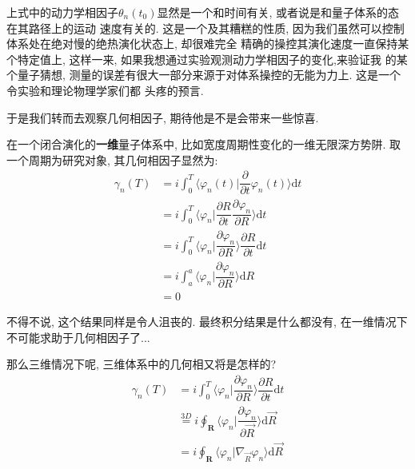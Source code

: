 \documentclass[a4paper, 11pt]{article}
\begin{document}
\begin{spacing}{1.2}
        上式中的动力学相因子$\theta_n(t_0)$显然是一个和时间有关, 或者说是和量子体系的态在其路径上的运动
        速度有关的. 这是一个及其糟糕的性质, 因为我们虽然可以控制体系处在绝对慢的绝热演化状态上, 却很难完全
        精确的操控其演化速度一直保持某个特定值上, 这样一来, 如果我想通过实验观测动力学相因子的变化,来验证我
        的某个量子猜想, 测量的误差有很大一部分来源于对体系操控的无能为力上. 这是一个令实验和理论物理学家们都
        头疼的预言. 

        于是我们转而去观察几何相因子, 期待他是不是会带来一些惊喜. 

        在一个闭合演化的\textbf{一维}量子体系中, 比如宽度周期性变化的一维无限深方势阱. 
        取一个周期为研究对象, 其几何相因子显然为:
        \begin{equation}
          \begin{aligned}
            \gamma_n(T) &=i\int_0^T\langle\varphi_n(t)|\dfrac{\partial}{\partial{}t}\varphi_n(t)\rangle\mathrm{d}t\\
                        &=i\int_0^T\langle\varphi_n|\dfrac{\partial{}R}{\partial{}t}\dfrac{\partial\varphi_n}{\partial{}R}\rangle\mathrm{d}t\\
                        &=i\int_0^T\langle\varphi_n|\dfrac{\partial\varphi_n}{\partial{}R}\rangle\dfrac{\partial{}R}{\partial{}t}\mathrm{d}t\\
                        &=i\int_a^a\langle\varphi_n|\dfrac{\partial\varphi_n}{\partial{}R}\rangle\mathrm{d}R\\
                        &=0
          \end{aligned}
        \end{equation}
        
        不得不说, 这个结果同样是令人沮丧的. 最终积分结果是什么都没有, 在一维情况下不可能求助于几何相因子了...

        那么三维情况下呢, 三维体系中的几何相又将是怎样的?
        \begin{equation}
          \label{barry_phase}
          \begin{aligned}
            \gamma_n(T) &=i\int_0^T\langle\varphi_n|\dfrac{\partial\varphi_n}{\partial{}R}\rangle\dfrac{\partial{}R}{\partial{}t}\mathrm{d}t\\
                        &\overset{3D}{=}i\oint_\mathbf{R}\langle\varphi_n|\dfrac{\partial\varphi_n}{\partial{}\vec{R}}\rangle\mathrm{d}\vec{R}\\
                        &=i\oint_\mathbf{R}\langle\varphi_n|\nabla_{\vec{R}}\varphi_n\rangle\mathrm{d}\vec{R}
          \end{aligned}
        \end{equation}
       

\end{spacing}
\end{document}
